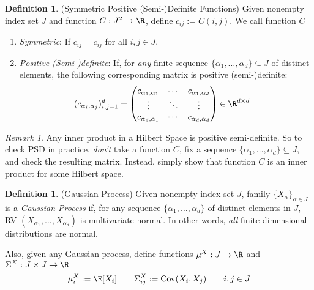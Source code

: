 \documentclass[12pt]{article}
\theoremstyle{plain}
\theoremstyle{definition}
\newtheorem{defn}[thm]{Definition}
\theoremstyle{remark}
\newtheorem*{rmk}{Remark}
\newcommand{\ra}{\rightarrow}
\newcommand{\Cov}{\operatorname{Cov}}
\begin{document}
\begin{defn}
\label{defn:psd}
(Symmetric Positive (Semi-)Definite Functions)
Given nonempty index set $J$ and function $C:J^2 \ra \R$,
define $c_{ij}:=C(i,j)$. We call function $C$
\begin{enumerate}
  \item \emph{Symmetric}: If $c_{ij}=c_{ij}$ for all $i,j \in J$.
  \item \emph{Positive (Semi-)definite}:
    If, for \emph{any} finite sequence
    $\{\alpha_1,\ldots,\alpha_d\}\subseteq J$ of distinct elements, the
    following corresponding matrix is positive (semi-)definite:
    \begin{align*}
      (c_{\alpha_i,\alpha_j})^d_{i,j=1}
      &=
      \begin{pmatrix}
        c_{\alpha_1,\alpha_1} &\cdots & c_{\alpha_1,\alpha_d} \\
        \vdots &\ddots & \vdots \\
        c_{\alpha_d,\alpha_1} &\cdots & c_{\alpha_d,\alpha_d} \\
      \end{pmatrix}
      \in \R^{d\times d}
    \end{align*}
\end{enumerate}
\end{defn}
\begin{rmk}
Any inner product in a Hilbert Space is positive semi-definite. So to
check PSD in practice, \emph{don't} take a function $C$, fix a sequence
$\{\alpha_1,\ldots,\alpha_d\}\subseteq J$, and check the resulting
matrix.
Instead, simply show that function $C$ is an inner product for some
Hilbert space.
\end{rmk}

\begin{defn}(Gaussian Process)
Given nonempty index set $J$, family $\{X_\alpha\}_{\alpha\in J}$
is a \emph{Gaussian Process} if, for any sequence $\{\alpha_1,\ldots,\alpha_d\}$
of distinct elements in $J$,
RV $(X_{\alpha_1},\ldots,X_{\alpha_d})$ is multivariate normal.
In other words, \emph{all} finite dimensional distributions are normal.

Also, given any Gaussian process, define functions
$\mu^X:J\ra \R$ and $\Sigma^X:J\times J \ra \R$
\begin{align}
  \mu_i^X := \E[X_i]
  \qquad
  \Sigma_{ij}^X := \Cov(X_i,X_j)
  \qquad i,j\in J
  \label{gaussianfunctions}
\end{align}
\end{defn}
\end{document}
